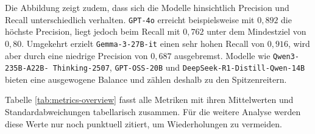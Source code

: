 Die Abbildung zeigt zudem, dass sich die Modelle hinsichtlich Precision und Recall unterschiedlich verhalten. \texttt{GPT-4o} erreicht beispielsweise mit $0{,}892$ die höchste Precision, liegt jedoch beim Recall mit $0{,}762$ unter dem Mindestziel von $0{,}80$. Umgekehrt erzielt \texttt{Gemma-3-27B-it} einen sehr hohen Recall von $0{,}916$, wird aber durch eine niedrige Precision von $0{,}687$ ausgebremst. Modelle wie \texttt{Qwen3-235B-A22B-\linebreak~Thinking-2507}, \texttt{GPT-OSS-20B} und \texttt{DeepSeek-R1-Distill-Qwen-14B} bieten eine ausgewogene Balance und zählen deshalb zu den Spitzenreitern.

Tabelle \ref{tab:metrics-overview} fasst alle Metriken mit ihren Mittelwerten und Standardabweichungen tabellarisch zusammen. Für die weitere Analyse werden diese Werte nur noch punktuell zitiert, um Wiederholungen zu vermeiden.

